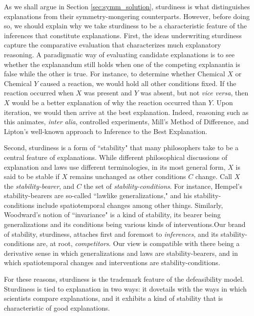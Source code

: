 \documentclass[natbib]{svjour3}                     %
\newcounter{fncntr}
\newcommand{\fnmark}[1]{\refstepcounter{fncntr}\label{#1}\footnotemark[\getrefnumber{#1}]}
\begin{document}
As we shall argue in Section \ref{sec:symm_solution}, sturdiness is what distinguishes explanations from their symmetry-mongering counterparts. However, before doing so, we should explain why we take sturdiness to be a characteristic feature of the inferences that constitute explanations. First, the ideas underwriting sturdiness capture the comparative evaluation that characterizes much explanatory reasoning. A paradigmatic way of evaluating candidate explanations is to see whether the explanandum still holds when one of the competing explanantia is false while the other is true. For instance, to determine whether Chemical $X$ or Chemical $Y$ caused a reaction, we would hold all other conditions fixed. If the reaction occurred when $X$ was present and $Y$ was absent, but not \textit{vice versa}, then $X$ would be a better explanation of why the reaction occurred than $Y$. Upon iteration, we would then arrive at the best explanation. Indeed, reasoning such as this animates, \textit{inter alia}, controlled experiments, Mill's Method of Difference, and Lipton's \citeyearpar{Lipton2004} well-known approach to Inference to the Best Explanation. 

Second, sturdiness is a form of ``stability" that many philosophers take to be a central feature of explanations. While different philosophical discussions of explanation and laws use different terminologies, in its most general form, $X$ is said to be stable if $X$ remains unchanged as other conditions $C$ change. Call $X$ the \textit{stability-bearer}, and $C$ the set of \textit{stability-conditions}. For instance, Hempel's stability-bearers are so-called ``lawlike generalizations," and his stability-conditions include spatiotemporal changes among other things. Similarly, Woodward's \cite{Woodward2003} notion of ``invariance" is a kind of stability, its bearer being generalizations and its conditions being various kinds of interventions.\fnmark{Sturdy}  Our brand of stability, sturdiness,  attaches first and foremost to \textit{inferences}, and its stability-conditions are, at root, \textit{competitors}. Our view is compatible with there being a derivative sense in which generalizations and laws are stability-bearers, and in which spatiotemporal changes and  interventions are stability-conditions.\fnmark{Woodward}

For these reasons, sturdiness is the trademark feature of the defeasibility model. Sturdiness is tied to explanation in two ways: it dovetails with the ways in which scientists compare explanations, and it exhibits a kind of stability that is characteristic of good explanations.
\end{document}
